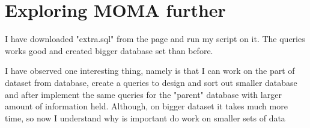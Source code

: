 \documentclass[journal,transmag]{IEEEtran}
\begin{document}
\begin{figure}[t]
\centering
\label{diagram}
\end{figure}


\section{Exploring MOMA further}

I have downloaded "extra.sql" from the page and run my script on it. The queries works good and created bigger database set than before. 

I have observed one interesting thing, namely is that I can work on the part of dataset from database, create a queries to design and sort out smaller database and after implement the same queries for the "parent" database with larger amount of information held. Although, on bigger dataset it takes much more time, so now I understand why is important do work on smaller sets of data
\end{document}
